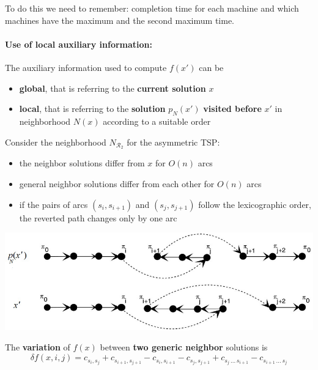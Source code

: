 \documentclass[11pt]{article}
\begin{document}
	To do this we need to remember: completion time for each machine and which machines have the maximum and the second maximum time.
	
	\newpage
	
	\paragraph{Use of local auxiliary information:} The auxiliary information used to compute $f (x')$ can be
	\begin{itemize}
		\item \textbf{global}, that is referring to the \textbf{current solution} $x$
		
		\item \textbf{local}, that is referring to the \textbf{solution} $p_N (x')$ \textbf{visited before} $x'$ in neighborhood $N (x)$ according to a suitable order
	\end{itemize}
	
	Consider the neighborhood $N_{\mathcal{R}_2}$ for the asymmetric TSP:
	\begin{itemize}
		\item the neighbor solutions differ from $x$ for $O (n)$ arcs
		
		\item general neighbor solutions differ from each other for $O (n)$ arcs
		
		\item if the pairs of arcs $(s_i , s_{i+1})$ and $(s_j , s_{j+1})$ follow the lexicographic order, the reverted path changes only by one arc
	\end{itemize}

	\begin{center}
		\includegraphics[width=0.9\columnwidth]{img/TSP4}
	\end{center}
	
	The \textbf{variation} of $f (x)$ between \textbf{two generic neighbor} solutions is
	$$ \delta f (x, i, j) = c_{s_i ,s_j} + c_{s_{i+1}, s_{j+1}} - c_{s_i ,s_{i+1}} - c_{s_j ,s_{j+1}} + c_{s_j \, ... \, s_{i+1}} - c_{s_{i+1} \, ... \, s_j} $$
	
\end{document}
